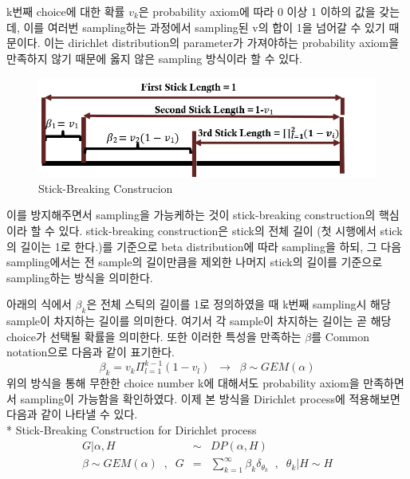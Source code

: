 \documentclass[a4paper]{oblivoir}
\begin{document}
k번째 choice에 대한 확률 $v_{k}$은 probability axiom에 따라 0 이상 1 이하의 값을 갖는데, 이를 여러번 sampling하는 과정에서 sampling된 v의 합이 1을 넘어갈 수 있기 때문이다. 이는 dirichlet distribution의 parameter가 가져야하는 probability axiom을 만족하지 않기 때문에 옳지 않은 sampling 방식이라 할 수 있다. 
\begin{figure}[ht] \centering 
\includegraphics[scale=0.7]{fig13_3.png} 
\caption{Stick-Breaking Construcion}
\label{fig:13-3}
\end{figure}
이를 방지해주면서 sampling을 가능케하는 것이 stick-breaking construction의 핵심이라 할 수 있다. stick-breaking construction은 stick의 전체 길이 (첫 시행에서 stick의 길이는 1로 한다.)를 기준으로 beta distribution에 따라 sampling을 하되, 그 다음 sampling에서는 전 sample의 길이만큼을 제외한 나머지 stick의 길이를 기준으로 sampling하는 방식을 의미한다. 

아래의 식에서 $\beta_{k}$은 전체 스틱의 길이를 1로 정의하였을 때 k번째 sampling시 해당 sample이 차지하는 길이를 의미한다. 여기서 각 sample이 차지하는 길이는 곧 해당 choice가 선택될 확률을 의미한다. 또한 이러한 특성을 만족하는 $\beta$를 Common notation으로 다음과 같이 표기한다. 
\begin{equation}
\beta_{k}=v_{k}\Pi^{k-1}_{l=1}(1-v_{l})\;\;\rightarrow\;\;\beta \sim GEM(\alpha)
\end{equation}
위의 방식을 통해 무한한 choice number k에 대해서도 probability axiom을 만족하면서 sampling이 가능함을 확인하였다. 이제 본 방식을 Dirichlet process에 적용해보면 다음과 같이 나타낼 수 있다.\\

* Stick-Breaking Construction for Dirichlet process
\begin{eqnarray}
G|\alpha,H&\sim&DP(\alpha,H) \\
\beta \sim GEM(\alpha)\;\;,\;\;G &=& \sum^{\infty}_{k=1}\beta_{k}\delta_{\theta_{k}}\;\;,\;\;\theta_{k}|H \sim H
\end{eqnarray}
\end{document}
